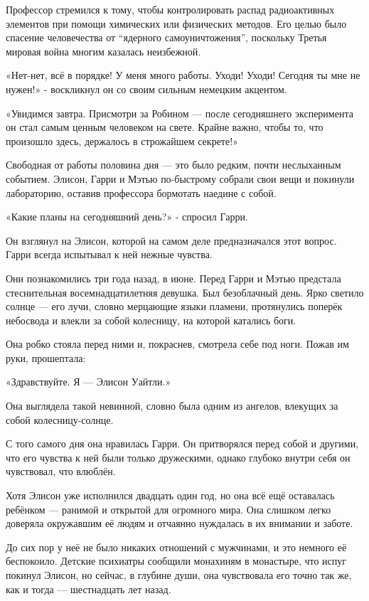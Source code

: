 \documentclass[a5paper, 9pt,
final, openany, twoside=true]{memoir}
\begin{document}
Профессор стремился к тому, чтобы контролировать распад радиоактивных элементов при помощи химических или физических методов. Его целью было спасение человечества от ``ядерного самоуничтожения'', поскольку Третья мировая война многим казалась неизбежной.\bigskip

«Нет-нет, всё в порядке! У меня много работы. Уходи! Уходи! Сегодня ты мне не нужен!» - воскликнул он со своим сильным немецким акцентом.

«Увидимся завтра. Присмотри за Робином — после сегодняшнего эксперимента он стал самым ценным человеком на свете. Крайне важно, чтобы то, что произошло здесь, держалось в строжайшем секрете!»

Свободная от работы половина дня — это было редким, почти неслыханным событием. Элисон, Гарри и Мэтью по-быстрому собрали свои вещи и покинули лабораторию, оставив профессора бормотать наедине с собой.\bigskip

«Какие планы на сегодняшний день?» - спросил Гарри.

Он взглянул на Элисон, которой на самом деле предназначался этот вопрос. Гарри всегда испытывал к ней нежные чувства.

Они познакомились три года назад, в июне. Перед Гарри и Мэтью предстала стеснительная восемнадцатилетняя девушка. Был безоблачный день. Ярко светило солнце — его лучи, словно мерцающие языки пламени, протянулись поперёк небосвода и влекли за собой колесницу, на которой катались боги.

Она робко стояла перед ними и, покраснев, смотрела себе под ноги. Пожав им руки, прошептала:

«Здравствуйте. Я — Элисон Уайтли.»\bigskip

Она выглядела такой невинной, словно была одним из ангелов, влекущих за собой колесницу-солнце.

С того самого дня она нравилась Гарри. Он притворялся перед собой и другими, что его чувства к ней были только дружескими, однако глубоко внутри себя он чувствовал, что влюблён.\bigskip

Хотя Элисон уже исполнился двадцать один год, но она всё ещё оставалась ребёнком — ранимой и открытой для огромного мира. Она слишком легко доверяла окружавшим её людям и отчаянно нуждалась в их внимании и заботе.

До сих пор у неё не было никаких отношений с мужчинами, и это немного её беспокоило. Детские психиатры сообщили монахиням в монастыре, что испуг покинул Элисон, но сейчас, в глубине души, она чувствовала его точно так же, как и тогда — шестнадцать лет назад.\bigskip
\end{document}
